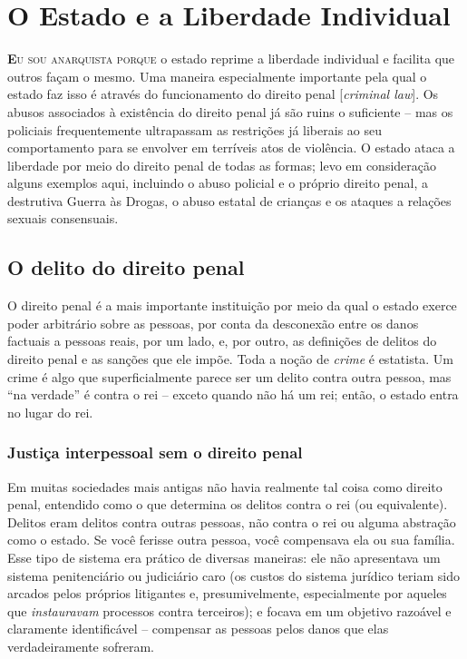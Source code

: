 
\chapter{O Estado e a Liberdade Individual}
\label{chap:5}

\lettrine[lines=2]{\textcolor{LettrineColor}{\textbf{E}}}{u sou anarquista porque} o estado reprime a liberdade individual e facilita que outros façam o mesmo. Uma maneira especialmente importante pela qual o estado faz isso é através do funcionamento do direito penal [\emph{criminal law}]. Os abusos associados à existência do direito penal já são ruins o suficiente -- mas os policiais frequentemente ultrapassam as restrições já liberais ao seu comportamento para se envolver em terríveis atos de violência. O estado ataca a liberdade por meio do direito penal de todas as formas; levo em consideração alguns exemplos aqui, incluindo o abuso policial e o próprio direito penal, a destrutiva Guerra às Drogas, o abuso estatal de crianças e os ataques a relações sexuais consensuais.

\section{O delito do direito penal}

O direito penal é a mais importante instituição por meio da qual o estado exerce poder arbitrário sobre as pessoas, por conta da desconexão entre os danos factuais a pessoas reais, por um lado, e, por outro, as definições de delitos do direito penal e as sanções que ele impõe. Toda a noção de \emph{crime} é estatista. Um crime é algo que superficialmente parece ser um delito contra outra pessoa, mas ``na verdade'' é contra o rei -- exceto quando não há um rei; então, o estado entra no lugar do rei.

\subsection*{Justiça interpessoal sem o direito penal}

Em muitas sociedades mais antigas não havia realmente tal coisa como direito penal, entendido como o que determina os delitos contra o rei (ou equivalente). Delitos eram delitos contra outras pessoas, não contra o rei ou alguma abstração como o estado. Se você ferisse outra pessoa, você compensava ela ou sua família. Esse tipo de sistema era prático de diversas maneiras: ele não apresentava um sistema penitenciário ou judiciário caro (os custos do sistema jurídico teriam sido arcados pelos próprios litigantes e, presumivelmente, especialmente por aqueles que \emph{instauravam} processos contra terceiros); e focava em um objetivo razoável e claramente identificável -- compensar as pessoas pelos danos que elas verdadeiramente sofreram.

